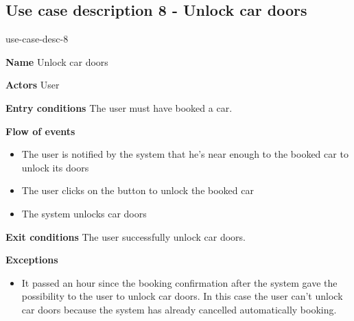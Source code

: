 \subsection{Use case description 8 - Unlock car doors}
\begin{labeling}{use-case-desc-8}
		\item[\textbf{Name}] Unlock car doors
		\item[\textbf{Actors}] User
		\item[\textbf{Entry conditions}] The user must have booked a car.
		\item[\textbf{Flow of events}]
			\begin{itemize}
				\item[]
				\item The user is notified by the system that he's near enough to the booked car to unlock its doors
				\item The user clicks on the button to unlock the booked car
				\item The system unlocks car doors
			\end{itemize}
		\item[\textbf{Exit conditions}] The user successfully unlock car doors.
		\item[\textbf{Exceptions}]
			\begin{itemize}
				\item[]
				\item It passed an hour since the booking confirmation after the system gave the possibility to the user to unlock car doors. In this case the user can't unlock car doors because the system has already cancelled automatically booking.  
			\end{itemize}
	\end{labeling}